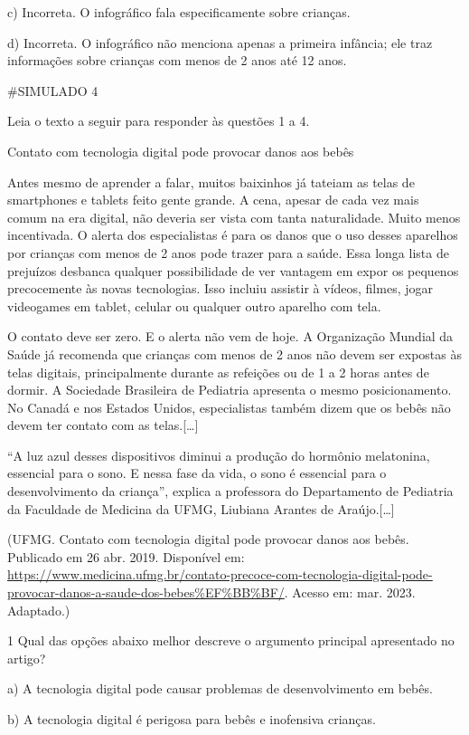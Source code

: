c) Incorreta. O infográfico fala especificamente sobre crianças.

d) Incorreta. O infográfico não menciona apenas a primeira infância; ele
traz informações sobre crianças com menos de 2 anos até 12 anos.

\#SIMULADO 4

Leia o texto a seguir para responder às questões 1 a 4.

Contato com tecnologia digital pode provocar danos aos bebês﻿

Antes mesmo de aprender a falar, muitos baixinhos já tateiam as telas de
smartphones e tablets feito gente grande. A cena, apesar de cada vez
mais comum na era digital, não deveria ser vista com tanta naturalidade.
Muito menos incentivada. O alerta dos especialistas é para os danos que
o uso desses aparelhos por crianças com menos de 2 anos pode trazer para
a saúde. Essa longa lista de prejuízos desbanca qualquer possibilidade
de ver vantagem em expor os pequenos precocemente às novas tecnologias.
Isso incluiu assistir à vídeos, filmes, jogar videogames em tablet,
celular ou qualquer outro aparelho com tela.

O contato deve ser zero. E o alerta não vem de hoje. A Organização
Mundial da Saúde já recomenda que crianças com menos de 2 anos não devem
ser expostas às telas digitais, principalmente durante as refeições ou
de 1 a 2 horas antes de dormir. A Sociedade Brasileira de Pediatria
apresenta o mesmo posicionamento. No Canadá e nos Estados Unidos,
especialistas também dizem que os bebês não devem ter contato com as
telas.{[}\ldots{}{]}

``A luz azul desses dispositivos diminui a produção do hormônio
melatonina, essencial para o sono. E nessa fase da vida, o sono é
essencial para o desenvolvimento da criança'', explica a professora do
Departamento de Pediatria da Faculdade de Medicina da UFMG, Liubiana
Arantes de Araújo.{[}\ldots{}{]}

(UFMG. Contato com tecnologia digital pode provocar danos aos bebês﻿.
Publicado em 26 abr. 2019. Disponível em: 
\url{https://www.medicina.ufmg.br/contato-precoce-com-tecnologia-digital-pode-provocar-danos-a-saude-dos-bebes\%EF\%BB\%BF/}.
Acesso em: mar. 2023. Adaptado.)

\num{1} Qual das opções abaixo melhor descreve o argumento principal
apresentado no artigo?

a) A tecnologia digital pode causar problemas de desenvolvimento em
bebês.

b) A tecnologia digital é perigosa para bebês e inofensiva crianças.

